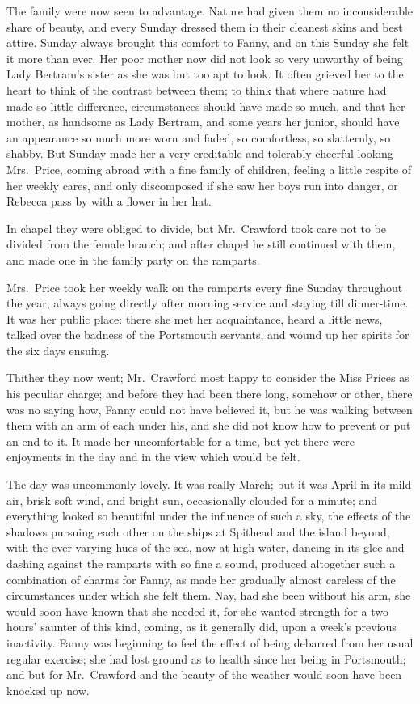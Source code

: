 The family were now seen to advantage.  Nature had given
them no inconsiderable share of beauty, and every Sunday
dressed them in their cleanest skins and best attire.
Sunday always brought this comfort to Fanny, and on this
Sunday she felt it more than ever.  Her poor mother now
did not look so very unworthy of being Lady Bertram's
sister as she was but too apt to look.  It often grieved
her to the heart to think of the contrast between them;
to think that where nature had made so little difference,
circumstances should have made so much, and that her mother,
as handsome as Lady Bertram, and some years her junior,
should have an appearance so much more worn and faded,
so comfortless, so slatternly, so shabby.  But Sunday
made her a very creditable and tolerably cheerful-looking
Mrs.\ Price, coming abroad with a fine family of children,
feeling a little respite of her weekly cares, and only
discomposed if she saw her boys run into danger, or Rebecca
pass by with a flower in her hat.

In chapel they were obliged to divide, but Mr.\ Crawford
took care not to be divided from the female branch;
and after chapel he still continued with them, and made
one in the family party on the ramparts.

Mrs.\ Price took her weekly walk on the ramparts every
fine Sunday throughout the year, always going directly
after morning service and staying till dinner-time. It
was her public place:  there she met her acquaintance,
heard a little news, talked over the badness of the
Portsmouth servants, and wound up her spirits for the six
days ensuing.

Thither they now went; Mr.\ Crawford most happy to consider
the Miss Prices as his peculiar charge; and before they
had been there long, somehow or other, there was no
saying how, Fanny could not have believed it, but he
was walking between them with an arm of each under his,
and she did not know how to prevent or put an end to it.
It made her uncomfortable for a time, but yet there
were enjoyments in the day and in the view which would
be felt.

The day was uncommonly lovely.  It was really March;
but it was April in its mild air, brisk soft wind,
and bright sun, occasionally clouded for a minute;
and everything looked so beautiful under the influence
of such a sky, the effects of the shadows pursuing each
other on the ships at Spithead and the island beyond,
with the ever-varying hues of the sea, now at high water,
dancing in its glee and dashing against the ramparts with
so fine a sound, produced altogether such a combination
of charms for Fanny, as made her gradually almost careless
of the circumstances under which she felt them.  Nay, had she
been without his arm, she would soon have known that she
needed it, for she wanted strength for a two hours'
saunter of this kind, coming, as it generally did,
upon a week's previous inactivity.  Fanny was beginning
to feel the effect of being debarred from her usual
regular exercise; she had lost ground as to health
since her being in Portsmouth; and but for Mr.\ Crawford
and the beauty of the weather would soon have been knocked
up now.

